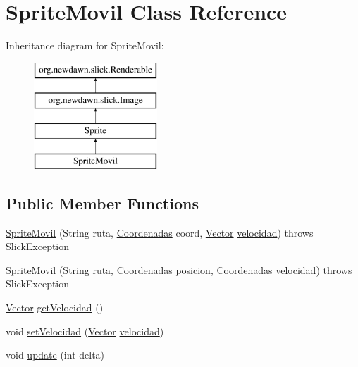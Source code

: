 \hypertarget{class_sprite_movil}{}\section{Sprite\+Movil Class Reference}
\label{class_sprite_movil}
Inheritance diagram for Sprite\+Movil\+:\begin{figure}[H]
\begin{center}
\leavevmode
\includegraphics[height=4.000000cm]{class_sprite_movil}
\end{center}
\end{figure}
\subsection*{Public Member Functions}
\begin{DoxyCompactItemize}
\item 
\mbox{\hyperlink{class_sprite_movil_aaf35285b6c2bdf70f1c23cfb71a6a9dd}{Sprite\+Movil}} (String ruta, \mbox{\hyperlink{class_coordenadas}{Coordenadas}} coord, \mbox{\hyperlink{class_vector}{Vector}} \mbox{\hyperlink{class_sprite_movil_a5f99cf7fe355c17b0dc3edb2f6fb4969}{velocidad}})  throws Slick\+Exception 
\item 
\mbox{\hyperlink{class_sprite_movil_a9175b9c7c135d677521ced51850902d3}{Sprite\+Movil}} (String ruta, \mbox{\hyperlink{class_coordenadas}{Coordenadas}} posicion, \mbox{\hyperlink{class_coordenadas}{Coordenadas}} \mbox{\hyperlink{class_sprite_movil_a5f99cf7fe355c17b0dc3edb2f6fb4969}{velocidad}})  throws Slick\+Exception
\item 
\mbox{\hyperlink{class_vector}{Vector}} \mbox{\hyperlink{class_sprite_movil_ac4622b6fb7f8fce4f6cf66db376cd38d}{get\+Velocidad}} ()
\item 
void \mbox{\hyperlink{class_sprite_movil_ad1477094c3bcef96fa83b7582f03ecb9}{set\+Velocidad}} (\mbox{\hyperlink{class_vector}{Vector}} \mbox{\hyperlink{class_sprite_movil_a5f99cf7fe355c17b0dc3edb2f6fb4969}{velocidad}})
\item 
void \mbox{\hyperlink{class_sprite_movil_a7d40c2a76b0be777aa231a971007637e}{update}} (int delta)
\end{DoxyCompactItemize}

